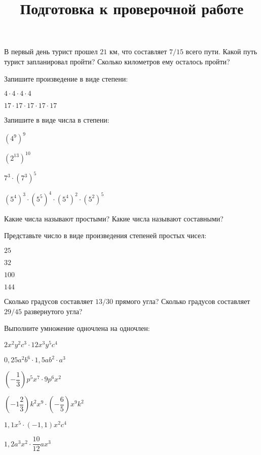 \newpage
\title{Подготовка к проверочной работе}
\begin{listofex}
	\item В первый день турист прошел \( 21 \) км, что составляет \( 7/15 \) всего пути. Какой путь турист запланировал пройти? Сколько километров ему осталось пройти?
	\item Запишите произведение в виде степени:
	\begin{enumcols}[itemcolumns=2]
		\item \( 4\cdot4\cdot4\cdot4 \)
		\item \( 17\cdot17\cdot17\cdot17\cdot17 \)
	\end{enumcols}
	\item Запишите в виде числа в степени:
	\begin{enumcols}[itemcolumns=3]
		\item \( (4^9)^9 \)
		\item \( (2^{13})^{10} \)
		\item \( 7^3\cdot(7^3)^{5} \)
		\item \( (5^4)^3\cdot(5^5)^4\cdot(5^4)^2\cdot(5^2)^5 \)
	\end{enumcols}
	\item Какие числа называют простыми? Какие числа называют составными?
	\item Представьте число в виде произведения степеней простых чисел:
	\begin{enumcols}[itemcolumns=4]
		\item \( 25 \)
		\item \( 32 \)
		\item \( 100 \)
		\item \( 144 \)
	\end{enumcols}
	\item Сколько градусов составляет \( 13/30 \) прямого угла? Сколько градусов составляет \( 29/45 \) развернутого угла?
	\item Выполните умножение одночлена на одночлен:
	\begin{enumcols}[itemcolumns=2]
		\item \( 2x^2y^2c^3\cdot12x^3y^5c^4 \)
		\item \( 0,25a^2b^6\cdot1,5ab^2\cdot a^3 \)
		\item \( \left( -\dfrac{1}{3} \right)p^5x^7\cdot9p^6x^2 \)
		\item \( \left( -1\dfrac{2}{3} \right)k^2x^9\cdot\left( -\dfrac{6}{5} \right)x^9k^2 \)
		\item \( 1,1x^5\cdot\left( -1,1 \right)x^2c^4 \)
		\item \( 1,2a^3x^2\cdot\dfrac{10}{12}ax^3 \)

\end{enumcols}
\end{listofex}
